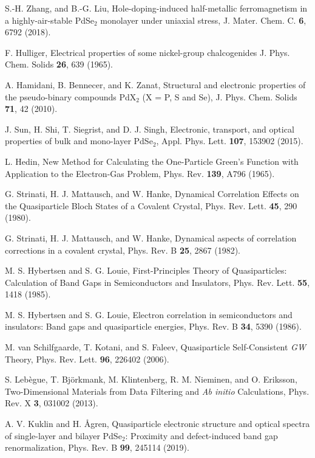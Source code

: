 \documentclass[aps,prb,longbibliography,twocolumn]{revtex4-2}
\begin{document}
\begin{thebibliography}{11}
S.-H. Zhang, and B.-G. Liu,
Hole-doping-induced half-metallic ferromagnetism in a highly-air-stable PdSe$_2$ monolayer under uniaxial stress,
J. Mater. Chem. C. {\bf 6}, 6792 (2018).

F. Hulliger, Electrical properties of some nickel-group chalcogenides J. Phys. Chem. Solids {\bf 26}, 639 (1965).

A. Hamidani, B. Bennecer, and K. Zanat, Structural and electronic properties of the pseudo-binary compounds PdX$_2$ (X = P, S and Se), J. Phys. Chem. Solids {\bf 71}, 42 (2010).

J. Sun, H. Shi, T. Siegrist, and D. J. Singh, Electronic, transport, and optical properties of bulk and mono-layer PdSe$_2$, Appl. Phys. Lett. {\bf 107}, 153902 (2015).

L. Hedin, New Method for Calculating the One-Particle Green's Function with Application to the Electron-Gas Problem, Phys. Rev. {\bf 139}, A796 (1965).

G. Strinati, H. J. Mattausch, and W. Hanke, Dynamical Correlation Effects on the Quasiparticle Bloch States of a Covalent Crystal, Phys. Rev. Lett. {\bf 45}, 290 (1980).

G. Strinati, H. J. Mattausch, and W. Hanke, Dynamical aspects of correlation corrections in a covalent crystal, Phys. Rev. B {\bf 25}, 2867 (1982).

M. S. Hybertsen and S. G. Louie, First-Principles Theory of Quasiparticles: Calculation of Band Gaps in Semiconductors and Insulators, Phys. Rev. Lett. {\bf 55}, 1418 (1985).

M. S. Hybertsen and S. G. Louie, Electron correlation in semiconductors and insulators: Band gaps and quasiparticle energies, Phys. Rev. B {\bf 34}, 5390 (1986).

M. van Schilfgaarde, T. Kotani, and S. Faleev, 
Quasiparticle Self-Consistent {\em GW} Theory, Phys. Rev. Lett. {\bf 96}, 226402 (2006).

S. Leb{\`e}gue, T. Bj{\"o}rkmank, M. Klintenberg, R. M. Nieminen, and O. Eriksson, Two-Dimensional Materials from Data Filtering and \textit{Ab initio} Calculations, Phys. Rev. X {\bf 3}, 031002 (2013). 

A. V. Kuklin and H. {\AA}gren,
Quasiparticle electronic structure and optical spectra of single-layer and bilayer
PdSe$_2$: Proximity and defect-induced band gap renormalization,
Phys. Rev. B {\bf 99}, 245114 (2019).


\end{thebibliography}
\end{document}

